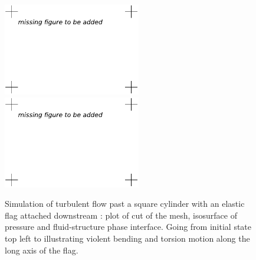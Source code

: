 \begin{figure}[!h]
{\includegraphics[width=6cm]{chapters/hoffman-1/pdf/cube550.pdf}
\includegraphics[width=6cm]{chapters/hoffman-1/pdf/cube649.pdf}
}
\caption{
Simulation of turbulent flow past a square cylinder with an elastic
flag attached downstream \cite{HoffmanJanssonEtAl2009}: plot of cut of
the mesh, isosurface of pressure and fluid-structure phase
interface. Going from initial state top left to illustrating violent
bending and torsion motion along the long axis of the flag.  }
\label{fig:flag}
\end{figure}
